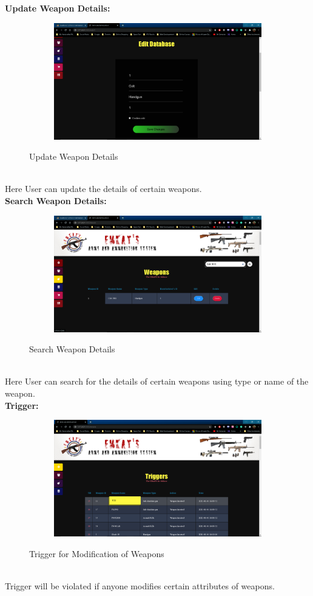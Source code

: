 \documentclass[12pt,a4paper]{report}
\begin{document}
\textbf{Update Weapon Details:}\\
\begin{figure}[hbtp]
\centering
\includegraphics[width=6in,height=2in]{../fig/updatee}\\
\caption{Update Weapon Details}
\end{figure}\\
\noindent
Here User can update the details of certain weapons.\\

\newpage
\textbf{Search Weapon Details:}\\
\begin{figure}[hbtp]
\centering
\includegraphics[width=6in,height=2in]{../fig/searchh}\\
\caption{Search Weapon Details}
\end{figure}\\
\noindent
Here User can search for the details of certain weapons using type or name of the weapon.\\

\textbf{Trigger:}\\
\begin{figure}[hbtp]
\centering
\includegraphics[width=6in,height=2in]{../fig/Trigger}\\
\caption{Trigger for Modification of Weapons}
\end{figure}\\
\noindent
Trigger will be violated if anyone modifies certain attributes of weapons.\\
\newpage
\end{document}
